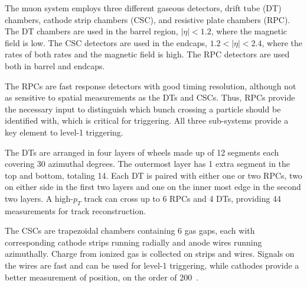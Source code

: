 The muon system employs three different gaseous detectors, drift
tube (DT) chambers, cathode strip chambers (CSC), and resistive
plate chambers (RPC).  The DT chambers are used in the barrel region, 
$|\eta|<1.2$, where the magnetic field is low.  The CSC detectors
are used in the endcaps, $1.2<|\eta|<2.4$, where the rates of both
rates and the magnetic field is high. The RPC detectors are used
both in barrel and endcaps.  

The RPCs are fast response detectors with good timing resolution,
although not as sensitive to spatial measurements as the DTs and
CSCs.  Thus, RPCs provide the necessary input to distinguish
which bunch crossing a particle should be identified with, which
is critical for triggering.  All three sub-systems provide a key
element to level-1 triggering.

The DTs are arranged in four layers of wheels made up of 12 
segments each covering 30 azimuthal degrees.  The outermost layer
has 1 extra segment in the top and bottom, totaling 14.  Each DT is
paired with either one or two RPCs, two on either side in the first
two layers and one on the inner most edge in the second two layers.
A high-$p_T$ track can cross up to 6 RPCs and 4 DTs, providing 44
measurements for track reconstruction.

The CSCs are trapezoidal chambers containing 6 gas gaps, each with
corresponding cathode strips running radially and anode wires
running azimuthally.  Charge from ionized gas is collected on 
strips and wires.  Signals on the wires are fast and can be used
for level-1 triggering, while cathodes provide a better measurement
of position, on the order of 200~\microns.

